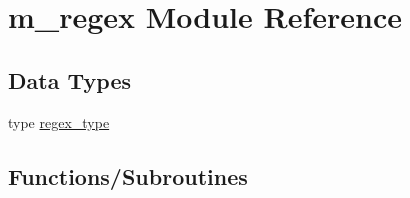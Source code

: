 \hypertarget{namespacem__regex}{}\section{m\+\_\+regex Module Reference}
\label{namespacem__regex}
\subsection*{Data Types}
\begin{DoxyCompactItemize}
\item 
type \hyperlink{structm__regex_1_1regex__type}{regex\+\_\+type}
\end{DoxyCompactItemize}
\subsection*{Functions/\+Subroutines}
